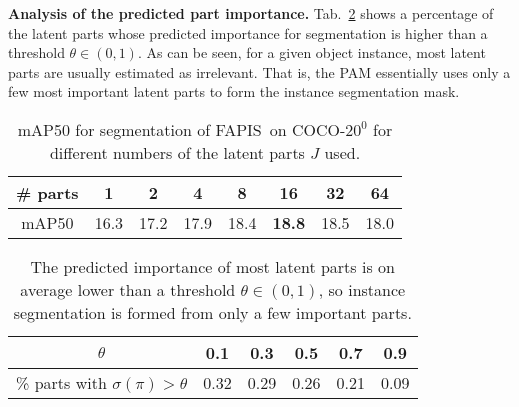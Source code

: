 \documentclass[final]{cvpr}
\def\Approach{FAPIS}
\begin{document}
{\bf  Analysis of the predicted part importance.} 
Tab.~\ref{tab:sparsity} shows a percentage of the latent parts whose predicted importance for segmentation is higher than a threshold $\theta \in (0, 1)$. As can be seen, for a given object instance, most latent parts are usually estimated as irrelevant. That is, the PAM essentially uses only a few most important latent parts to form the instance segmentation mask.  

\begin{table}[]
\begin{center}
\small
\begin{tabular}{c|c|c|c|c|c|c|c}
\hline
\hline
\textbf{\# parts}  & 1 & 2 & 4 & 8 & 16 & 32 & 64  \\
\hline
mAP50 & 16.3 & 17.2 & 17.9 & 18.4 & \textbf{18.8} & 18.5 & 18.0 \\
\hline 
\hline
\end{tabular}
\end{center}
\caption{mAP50 for segmentation of \Approach~on COCO-$20^0$ for different numbers of the latent parts $J$ used.%
}
\label{tab:num_parts}
\end{table}


\begin{table}[]
\begin{center}
\small
\begin{tabular}{c|c|c|c|c|c}
\hline
\hline
$\theta$ & 0.1 & 0.3 & 0.5 & 0.7 & 0.9 \\
\hline
\% parts with $\sigma(\pi) {>}\theta$ & 0.32 & 0.29 & 0.26 & 0.21 & 0.09  \\
\hline 
\hline
\end{tabular}
\end{center}
\caption{The predicted importance of most latent parts is on average lower than a threshold $\theta\in(0,1)$, so instance segmentation is formed from only a few important parts.}
\label{tab:sparsity}
\end{table}
\end{document}
